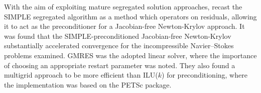 \documentclass[sn-mathphys,Numbered]{sn-jnl}%
\begin{document}
With the aim of exploiting mature segregated solution approaches, \citet{Pernice2001} recast the SIMPLE segregated algorithm as a method which operators on residuals, allowing it to act as the preconditioner for a Jacobian-free Newton-Krylov approach.
It was found that the SIMPLE-preconditioned Jacobian-free Newton-Krylov substantially accelerated convergence for the incompressible Navier–Stokes problems examined.
GMRES was the adopted linear solver, where the importance of choosing an appropriate restart parameter was noted.
They also found a multigrid approach to be more efficient than ILU($k$) for preconditioning, where the implementation was based on the PETSc \citep{PETSc} package.
\end{document}
